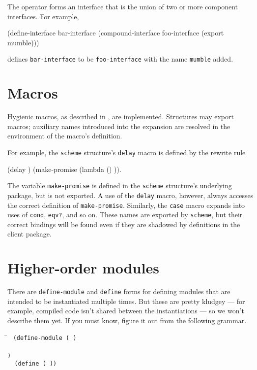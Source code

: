 The  operator forms an interface that is the
union of two or more component interfaces.  For example,
\begin{example}
(define-interface bar-interface
  (compound-interface foo-interface (export mumble)))
\end{example}
defines {\tt bar-interface} to be {\tt foo-interface} with the name
{\tt mumble} ad\-ded.


\section{Macros}

Hygienic macros, as described in
\cite{Clinger-Rees:Macros,Clinger-Rees:R4RS}, are implemented.
Structures may export macros; auxiliary names introduced into the
expansion are resolved in the environment of the macro's definition.

For example, the {\tt scheme} structure's {\tt delay} macro 
is defined by the rewrite rule
\begin{example}
(delay )  \xform  (make-promise (lambda () )).
\end{example}
The variable {\tt make-promise} is defined in the {\tt scheme}
structure's underlying package, but is not exported.  A use of the
{\tt delay} macro, however, always accesses the correct definition
of {\tt make-promise}.  Similarly, the {\tt case} macro expands into
uses of {\tt cond}, {\tt eqv?}, and so on.  These names are exported
by {\tt scheme}, but their correct bindings will be found even if they
are shadowed by definitions in the client package.


\section{Higher-order modules}

There are {\tt define-module} and {\tt define} forms for
defining modules that are intended to be instantiated multiple times.
But these are pretty kludgey --- for example, compiled code isn't
shared between the instantiations --- so we won't describe them yet.
If you must know, figure it out from the following grammar.
\begin{tabbing}
\qquad
    \=\goesto{}~
      \tt(d\=\tt efine-module ( ) \\
       \>  \> \\
       \>  \>\tt) \\
        \>\altz{}~ \tt(define 
                        ( ))
\end{tabbing}

